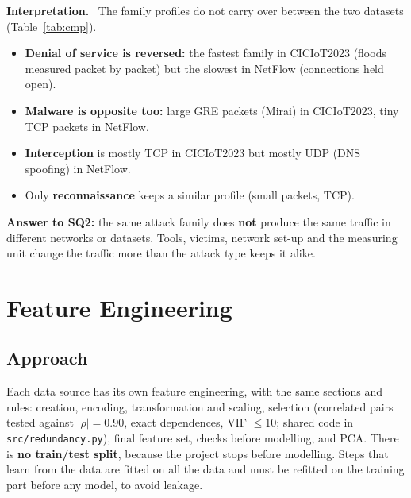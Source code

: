 \documentclass[12pt,a4paper]{article}
\newcommand{\file}[1]{\nolinkurl{#1}}
\newenvironment{interp}{\par\smallskip\noindent\begin{minipage}{\linewidth}\setlength{\parskip}{5pt}\textbf{\color{navy}Interpretation.}\ }{\end{minipage}\par\medskip}
\begin{document}
\begin{interp}
The family profiles do not carry over between the two datasets (Table~\ref{tab:cmp}).
\begin{itemize}
  \item \textbf{Denial of service is reversed:} the fastest family in CICIoT2023 (floods measured packet by packet)
        but the slowest in NetFlow (connections held open).
  \item \textbf{Malware is opposite too:} large GRE packets (Mirai) in CICIoT2023, tiny TCP packets in NetFlow.
  \item \textbf{Interception} is mostly TCP in CICIoT2023 but mostly UDP (DNS spoofing) in NetFlow.
  \item Only \textbf{reconnaissance} keeps a similar profile (small packets, TCP).
\end{itemize}
\textbf{Answer to SQ2:} the same attack family does \textbf{not} produce the same traffic in different networks or
datasets. Tools, victims, network set-up and the measuring unit change the traffic more than the attack type keeps
it alike.
\end{interp}

\section{Feature Engineering}

\subsection{Approach}
Each data source has its own feature engineering, with the same sections and rules: creation, encoding,
transformation and scaling, selection (correlated pairs tested against $|\rho| = 0.90$, exact dependences, VIF $\leq 10$;
shared code in \file{src/redundancy.py}), final feature set, checks before modelling, and PCA. There is \textbf{no
train/test split}, because the project stops before modelling. Steps that learn from the data are fitted on all the
data and must be refitted on the training part before any model, to avoid leakage.
\end{document}
